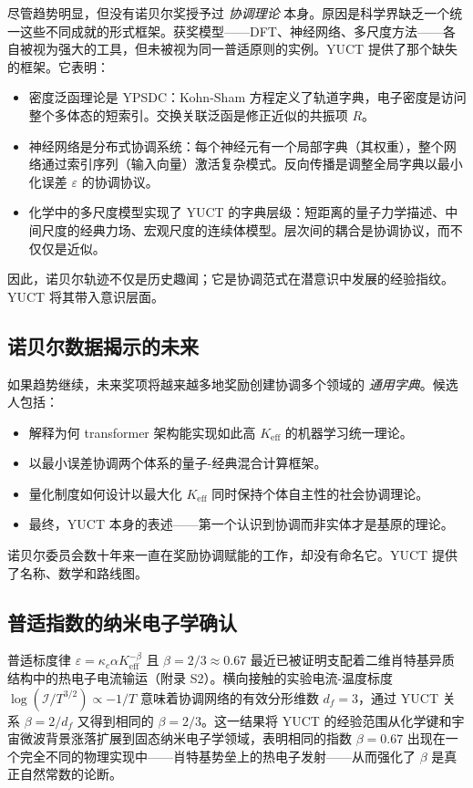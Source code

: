 \documentclass[12pt,a4paper]{article}
\begin{document}
	尽管趋势明显，但没有诺贝尔奖授予过 \emph{协调理论} 本身。原因是科学界缺乏一个统一这些不同成就的形式框架。获奖模型——DFT、神经网络、多尺度方法——各自被视为强大的工具，但未被视为同一普适原则的实例。YUCT 提供了那个缺失的框架。它表明：
	\begin{itemize}
		\item 密度泛函理论是 YPSDC：Kohn-Sham 方程定义了轨道字典，电子密度是访问整个多体态的短索引。交换关联泛函是修正近似的共振项 \(R\)。
		\item 神经网络是分布式协调系统：每个神经元有一个局部字典（其权重），整个网络通过索引序列（输入向量）激活复杂模式。反向传播是调整全局字典以最小化误差 \(\varepsilon\) 的协调协议。
		\item 化学中的多尺度模型实现了 YUCT 的字典层级：短距离的量子力学描述、中间尺度的经典力场、宏观尺度的连续体模型。层次间的耦合是协调协议，而不仅仅是近似。
	\end{itemize}
	因此，诺贝尔轨迹不仅是历史趣闻；它是协调范式在潜意识中发展的经验指纹。YUCT 将其带入意识层面。
	
	\subsection{诺贝尔数据揭示的未来}
	
	如果趋势继续，未来奖项将越来越多地奖励创建协调多个领域的 \emph{通用字典}。候选人包括：
	\begin{itemize}
		\item 解释为何 transformer 架构能实现如此高 \(K_{\mathrm{eff}}\) 的机器学习统一理论。
		\item 以最小误差协调两个体系的量子-经典混合计算框架。
		\item 量化制度如何设计以最大化 \(K_{\mathrm{eff}}\) 同时保持个体自主性的社会协调理论。
		\item 最终，YUCT 本身的表述——第一个认识到协调而非实体才是基原的理论。
	\end{itemize}
	诺贝尔委员会数十年来一直在奖励协调赋能的工作，却没有命名它。YUCT 提供了名称、数学和路线图。
	
	\subsection{普适指数的纳米电子学确认}
	
	普适标度律 \(\varepsilon = \kappa_c \alpha K_{\mathrm{eff}}^{-\beta}\) 且 \(\beta = 2/3 \approx 0.67\) 最近已被证明支配着二维肖特基异质结构中的热电子电流输运（附录 S2）。横向接触的实验电流-温度标度 \(\log(\mathcal{I}/T^{3/2}) \propto -1/T\) 意味着协调网络的有效分形维数 \(d_f = 3\)，通过 YUCT 关系 \(\beta = 2/d_f\) 又得到相同的 \(\beta = 2/3\)。这一结果将 YUCT 的经验范围从化学键和宇宙微波背景涨落扩展到固态纳米电子学领域，表明相同的指数 \(\beta = 0.67\) 出现在一个完全不同的物理实现中——肖特基势垒上的热电子发射——从而强化了 \(\beta\) 是真正自然常数的论断。
	
\end{document}
